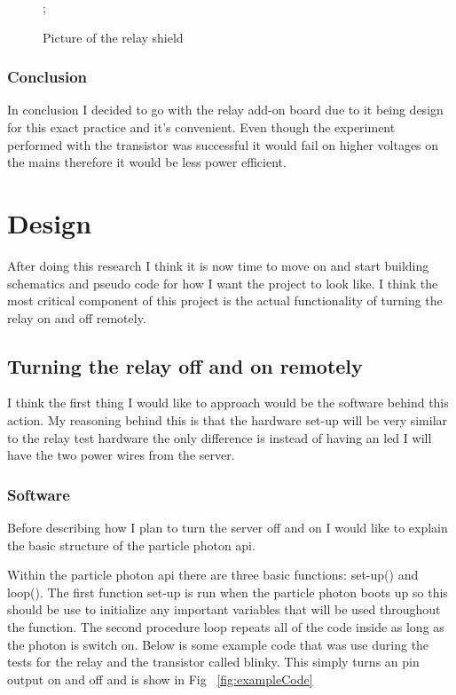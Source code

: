 \documentclass{article}
\begin{document}
\begin{figure}[H]
    \noindent{};
    \caption{Picture of the relay shield} \label{fig:relayShield}
\end{figure}

\subsubsection{Conclusion}
In conclusion I decided to go with the relay add-on board due to it being design for this exact practice and
it's convenient. Even though the experiment performed with the transistor was successful it would fail on
higher voltages on the mains therefore it would be less power efficient.

\section{Design}

After doing this research I think it is now time to move on and start building schematics and pseudo code
for how I want the project to look like. I think the most critical component of this project is the
actual functionality of turning the relay on and off remotely.

\subsection{Turning the relay off and on remotely}
I think the first thing I would like to approach would be the software behind this action. My reasoning
behind this is that the hardware set-up will be very similar to the relay test hardware the only difference
is instead of having an led I will have the two power wires from the server.

\subsubsection{Software}
Before describing how I plan to turn the server off and on I would like to explain the basic structure of
the particle photon api.

Within the particle photon api there are three basic functions: set-up() and loop(). The first function
set-up is run when the particle photon boots up so this should be use to initialize any important variables
that will be used throughout the function. The second procedure loop repeats all of the code inside as long
as the photon is switch on. Below is some example code that was use during the tests for the relay and the
transistor called blinky. This simply turns an pin output on and off and is show in Fig ~\ref{fig:exampleCode}
\end{document}
